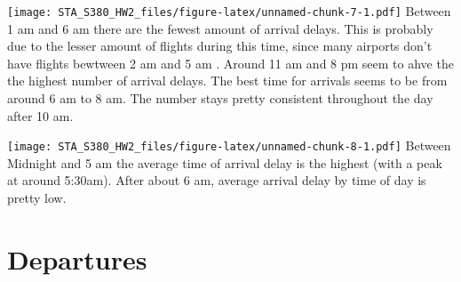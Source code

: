 \documentclass[]{article}
\newenvironment{Shaded}{\begin{snugshade}}{\end{snugshade}}
\newcommand{\KeywordTok}[1]{\textcolor[rgb]{0.13,0.29,0.53}{\textbf{#1}}}
\newcommand{\DataTypeTok}[1]{\textcolor[rgb]{0.13,0.29,0.53}{#1}}
\newcommand{\DecValTok}[1]{\textcolor[rgb]{0.00,0.00,0.81}{#1}}
\newcommand{\StringTok}[1]{\textcolor[rgb]{0.31,0.60,0.02}{#1}}
\newcommand{\CommentTok}[1]{\textcolor[rgb]{0.56,0.35,0.01}{\textit{#1}}}
\newcommand{\OperatorTok}[1]{\textcolor[rgb]{0.81,0.36,0.00}{\textbf{#1}}}
\newcommand{\NormalTok}[1]{#1}
\begin{document}
\texttt{[image: STA\_S380\_HW2\_files/figure-latex/unnamed-chunk-7-1.pdf]}
Between 1 am and 6 am there are the fewest amount of arrival delays.
This is probably due to the lesser amount of flights during this time,
since many airports don't have flights bewtween 2 am and 5 am . Around
11 am and 8 pm seem to ahve the the highest number of arrival delays.
The best time for arrivals seems to be from around 6 am to 8 am. The
number stays pretty consistent throughout the day after 10 am.

\begin{Shaded}
\end{Shaded}

\texttt{[image: STA\_S380\_HW2\_files/figure-latex/unnamed-chunk-8-1.pdf]}
Between Midnight and 5 am the average time of arrival delay is the
highest (with a peak at around 5:30am). After about 6 am, average
arrival delay by time of day is pretty low.

\section{Departures}\label{departures}
\end{document}
